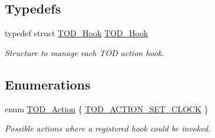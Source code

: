\subsection*{Typedefs}
\begin{DoxyCompactItemize}
\item 
\mbox{\label{group__RTEMSScoreTODHooks_ga7d9ee399e6082e0eb83b84718431a9b8}} 
typedef struct \mbox{\hyperlink{structTOD__Hook}{T\+O\+D\+\_\+\+Hook}} \mbox{\hyperlink{group__RTEMSScoreTODHooks_ga7d9ee399e6082e0eb83b84718431a9b8}{T\+O\+D\+\_\+\+Hook}}
\begin{DoxyCompactList}\small\item\em Structure to manage each T\+OD action hook. \end{DoxyCompactList}\end{DoxyCompactItemize}
\subsection*{Enumerations}
\begin{DoxyCompactItemize}
\item 
enum \mbox{\hyperlink{group__RTEMSScoreTODHooks_gab9b3d7e3a626139950c25efa888d4332}{T\+O\+D\+\_\+\+Action}} \{ \mbox{\hyperlink{group__RTEMSScoreTODHooks_ggab9b3d7e3a626139950c25efa888d4332a93091d0c963aeebf2726ecdb20f74105}{T\+O\+D\+\_\+\+A\+C\+T\+I\+O\+N\+\_\+\+S\+E\+T\+\_\+\+C\+L\+O\+CK}}
 \}
\begin{DoxyCompactList}\small\item\em Possible actions where a registered hook could be invoked. \end{DoxyCompactList}\end{DoxyCompactItemize}
